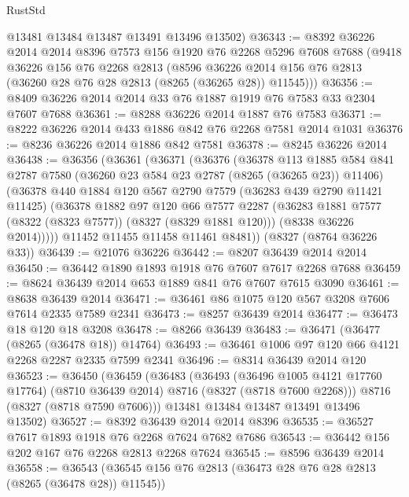 \begin{lexlean}{RustStd}
\begin{coremodule}
      @13481
      @13484
      @13487
      @13491
      @13496
      @13502)
@36343 := @8392
    @36226
    @2014
    @2014
    @8396
    @7573
    @156
    @1920
    @76
    @2268
    @5296
    @7608
    @7688
    (@9418
      @36226
      @156
      @76
      @2268
      @2813
      (@8596 @36226 @2014 @156 @76 @2813 (@36260 @28 @76 @28 @2813 (@8265 (@36265 @28)) @11545)))
@36356 := @8409 @36226 @2014 @2014 @33 @76 @1887 @1919 @76 @7583 @33 @2304 @7607 @7688
@36361 := @8288 @36226 @2014 @1887 @76 @7583
@36371 := @8222 @36226 @2014 @433 @1886 @842 @76 @2268 @7581 @2014 @1031
@36376 := @8236 @36226 @2014 @1886 @842 @7581
@36378 := @8245 @36226 @2014
@36438 := @36356
    (@36361
      (@36371
        (@36376
          (@36378
            @113
            @1885
            @584
            @841
            @2787
            @7580
            (@36260 @23 @584 @23 @2787 (@8265 (@36265 @23)) @11406)
            (@36378
              @440
              @1884
              @120
              @567
              @2790
              @7579
              (@36283 @439 @2790 @11421 @11425)
              (@36378
                @1882
                @97
                @120
                @66
                @7577
                @2287
                (@36283 @1881 @7577 (@8322 (@8323 @7577)) (@8327 (@8329 @1881 @120)))
                (@8338 @36226 @2014)))))
        @11452
        @11455
        @11458
        @11461
        @8481))
    (@8327 (@8764 @36226 @33))
@36439 := @21076 @36226
@36442 := @8207 @36439 @2014 @2014
@36450 := @36442 @1890 @1893 @1918 @76 @7607 @7617 @2268 @7688
@36459 := @8624 @36439 @2014 @653 @1889 @841 @76 @7607 @7615 @3090
@36461 := @8638 @36439 @2014
@36471 := @36461 @86 @1075 @120 @567 @3208 @7606 @7614 @2335 @7589 @2341
@36473 := @8257 @36439 @2014
@36477 := @36473 @18 @120 @18 @3208
@36478 := @8266 @36439
@36483 := @36471 (@36477 (@8265 (@36478 @18)) @14764)
@36493 := @36461 @1006 @97 @120 @66 @4121 @2268 @2287 @2335 @7599 @2341
@36496 := @8314 @36439 @2014 @120
@36523 := @36450
    (@36459
      (@36483
        (@36493
          (@36496 @1005 @4121 @17760 @17764)
          (@8710 @36439 @2014)
          @8716
          (@8327 (@8718 @7600 @2268)))
        @8716
        (@8327 (@8718 @7590 @7606)))
      @13481
      @13484
      @13487
      @13491
      @13496
      @13502)
@36527 := @8392 @36439 @2014 @2014 @8396
@36535 := @36527 @7617 @1893 @1918 @76 @2268 @7624 @7682 @7686
@36543 := @36442 @156 @202 @167 @76 @2268 @2813 @2268 @7624
@36545 := @8596 @36439 @2014
@36558 := @36543 (@36545 @156 @76 @2813 (@36473 @28 @76 @28 @2813 (@8265 (@36478 @28)) @11545))

\end{coremodule}
\end{lexlean}
